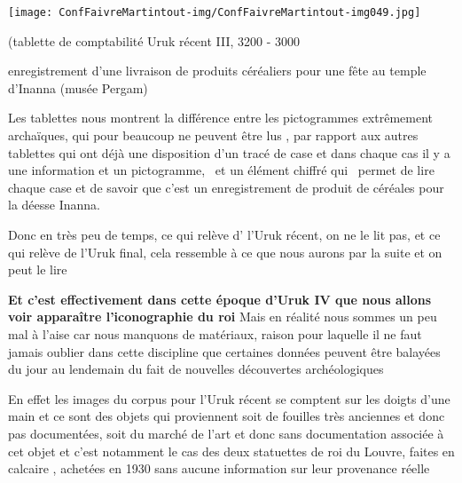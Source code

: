 \documentclass[a4paper]{article}
\begin{document}
\bigskip


\bigskip


\bigskip


\texttt{[image: ConfFaivreMartintout-img/ConfFaivreMartintout-img049.jpg]}



\bigskip

{
(tablette de comptabilité Uruk récent III, 3200 - 3000}

{
enregistrement d'une livraison de produits céréaliers pour une fête au
temple d'Inanna (musée Pergam)}


\bigskip


\bigskip

{
Les tablettes nous montrent la différence entre les pictogrammes
extrêmement archaïques, qui pour beaucoup ne peuvent être lus , par
rapport aux autres tablettes qui ont déjà une disposition d'un tracé de
case et dans chaque cas il y a une information et un pictogramme, \ et
un élément chiffré qui \ permet de lire chaque case et de savoir que
c'est un enregistrement de produit de céréales pour la déesse Inanna.}


\bigskip

{
Donc en très peu de temps, ce qui relève d' l'Uruk récent, on ne le lit
pas, et ce qui relève de l'Uruk final, cela ressemble à ce que nous
aurons par la suite et on peut le lire}


\bigskip


\bigskip


\bigskip


\bigskip


\bigskip


\bigskip


\bigskip


\bigskip


\bigskip

{
\textbf{Et c'est effectivement dans cette époque d'Uruk IV que nous
allons voir apparaître l'iconographie du roi} Mais en réalité nous
sommes un peu mal à l'aise car nous manquons de matériaux, raison pour
laquelle il ne faut jamais oublier dans cette discipline que certaines
données peuvent être balayées du jour au lendemain du fait de nouvelles
découvertes archéologiques}


\bigskip

{
En effet les images du corpus pour l'Uruk récent se comptent sur les
doigts d'une main et ce sont des objets qui proviennent soit de
fouilles très anciennes et donc pas documentées, soit du marché de
l'art et donc sans documentation associée à cet objet et c'est
notamment le cas des deux statuettes de roi du Louvre, faites en
calcaire , achetées en 1930 sans aucune information sur leur provenance
réelle}
\end{document}
